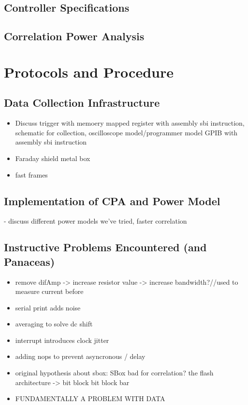 \documentclass[journal]{ieee_style}
\begin{document}
\subsection{Controller Specifications}
\subsection{Correlation Power Analysis}

\section{Protocols and Procedure}

\subsection{Data Collection Infrastructure}
\begin{itemize}[-]
\item Discuss trigger with memoery mapped register with assembly sbi instruction, schematic for collection, oscilloscope model/programmer model GPIB with assembly sbi instruction
\item Faraday shield metal box
\item fast frames
\end{itemize}

\subsection{Implementation of CPA and Power Model}
- discuss different power models we've tried, faster correlation

\subsection{Instructive Problems Encountered (and Panaceas)}

\begin{itemize}[-]
\item remove difAmp -> increase resistor value -> increase bandwidth?//used to measure current before
\item serial print adds noise
\item averaging to solve dc shift
\item interrupt introduces clock jitter
\item adding nops to prevent asyncronous / delay
\item original hypothesis about sbox:  SBox bad for correlation? the flash architecture -> bit block bit block bar
\item FUNDAMENTALLY A PROBLEM WITH DATA
\end{itemize}
\end{document}
